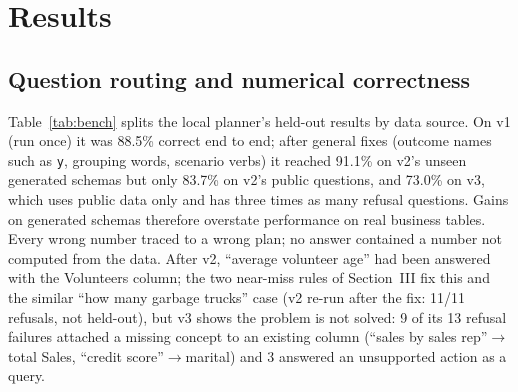 \documentclass[conference]{IEEEtran}
\begin{document}
\begin{table}[t]
\caption{Public datasets: profile and data intelligence}
\label{tab:data}
\centering\scriptsize
\setlength{\tabcolsep}{3pt}
\end{table}

\section{Results}
\subsection{Question routing and numerical correctness}
Table~\ref{tab:bench} splits the local planner's held-out results by data source. On v1 (run once) it was 88.5\% correct end to end; after general fixes (outcome names such as \texttt{y}, grouping words, scenario verbs) it reached 91.1\% on v2's unseen generated schemas but only 83.7\% on v2's public questions, and 73.0\% on v3, which uses public data only and has three times as many refusal questions. Gains on generated schemas therefore overstate performance on real business tables. Every wrong number traced to a wrong plan; no answer contained a number not computed from the data. After v2, ``average volunteer age'' had been answered with the Volunteers column; the two near-miss rules of Section~III fix this and the similar ``how many garbage trucks'' case (v2 re-run after the fix: 11/11 refusals, not held-out), but v3 shows the problem is not solved: 9 of its 13 refusal failures attached a missing concept to an existing column (``sales by sales rep''$\to$total Sales, ``credit score''$\to$marital) and 3 answered an unsupported action as a query.
\end{document}

